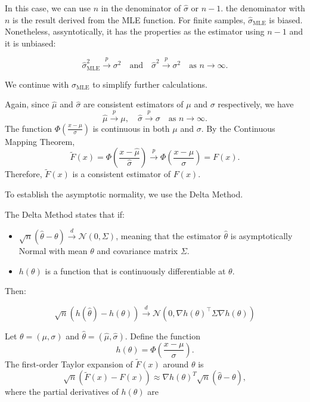 \documentclass{article}
\begin{document}
In this case, we can use $n$ in the denominator of $\hat{\sigma}$ or $n-1$. the denominator with $n$ is the result derived from the MLE function. For finite samples, $\hat{\sigma}_{\text{MLE}}$ is biased. Nonetheless, assyntotically, it has the properties as the estimator using $n-1$ and it is unbiased:

\[
\hat{\sigma}_{\text{MLE}}^2 \xrightarrow{p} \sigma^2 \quad \text{and} \quad \hat{\sigma}^2 \xrightarrow{p} \sigma^2 \quad \text{as } n \to \infty.
\]

We continue with $\hat{\sigma}_{\text{MLE}}$ to simplify further calculations.

Again, since \( \hat{\mu} \) and \( \hat{\sigma} \) are consistent estimators of \( \mu \) and \( \sigma \) respectively, we have
\[
\hat{\mu} \xrightarrow{p} \mu, \quad \hat{\sigma} \xrightarrow{p} \sigma \quad \text{as } n \to \infty.
\]
The function \( \Phi\left( \frac{x - \mu}{\sigma} \right) \) is continuous in both \( \mu \) and \( \sigma \). By the Continuous Mapping Theorem,
\[
\tilde{F}(x) = \Phi\left( \frac{x - \hat{\mu}}{\hat{\sigma}} \right) \xrightarrow{p} \Phi\left( \frac{x - \mu}{\sigma} \right) = F(x).
\]
Therefore, \( \tilde{F}(x) \) is a consistent estimator of \( F(x) \).

To establish the asymptotic normality, we use the Delta Method.

The Delta Method states that if:
\begin{itemize}
  \item \( \sqrt{n} (\hat{\theta} - \theta) \xrightarrow{d} \mathcal{N}(0, \Sigma) \), meaning that the estimator  $\hat{\theta}$  is asymptotically Normal with mean  $\theta$  and covariance matrix  $\Sigma$.
  \item $h(\theta)$  is a function that is continuously differentiable at  $\theta $.
\end{itemize}

Then:

$$
\sqrt{n} (h(\hat{\theta}) - h(\theta)) \xrightarrow{d} \mathcal{N}(0, \nabla h(\theta)^\top \Sigma \nabla h(\theta))
$$


Let \( \theta = (\mu, \sigma) \) and \( \hat{\theta} = (\hat{\mu}, \hat{\sigma}) \). Define the function
\[
h(\theta) = \Phi\left( \frac{x - \mu}{\sigma} \right).
\]
The first-order Taylor expansion of \( \tilde{F}(x) \) around \( \theta \) is
\[
\sqrt{n} \left( \tilde{F}(x) - F(x) \right) \approx \nabla h(\theta)^T \sqrt{n} (\hat{\theta} - \theta),
\]
where the partial derivatives of \( h(\theta) \) are
\end{document}
